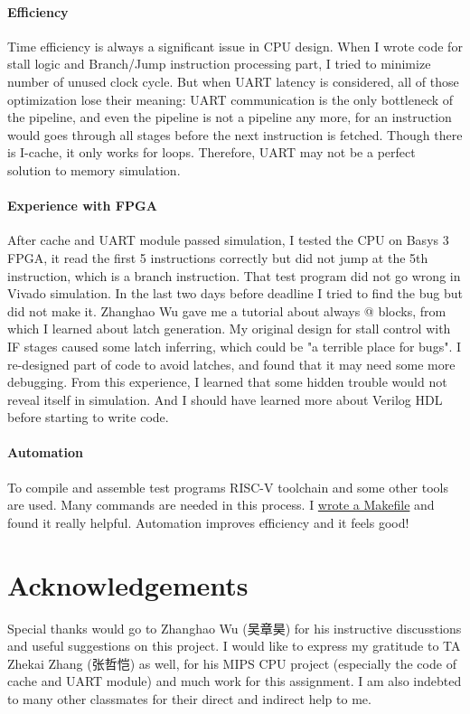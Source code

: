 \documentclass[12pt, a4paper]{article}
\theoremstyle{margin}
\begin{document}
\paragraph{Efficiency} Time efficiency is always a significant issue in CPU design. When I wrote code for stall logic and Branch/Jump instruction processing part, I tried to minimize number of unused clock cycle. But when UART latency is considered, all of those optimization lose their meaning: UART communication is the only bottleneck of the pipeline, and even the pipeline is not a pipeline any more, for an instruction would goes through all stages before the next instruction is fetched. Though there is I-cache, it only works for loops. Therefore, UART may not be a perfect solution to memory simulation.

\paragraph{Experience with FPGA} After cache and UART module passed simulation, I tested the CPU on Basys 3 FPGA, it read the first 5 instructions correctly but did not jump at the 5th instruction, which is a branch instruction. That test program did not go wrong in Vivado simulation. In the last two days before deadline I tried to find the bug but did not make it. Zhanghao Wu gave me a tutorial about always @ blocks\cite{always}, from which I learned about latch generation. My original design for stall control with IF stages caused some latch inferring, which could be "a
terrible place for bugs"\cite{always}. I re-designed part of code to avoid latches, and found that it may need some more debugging. From this experience, I learned that some hidden trouble would not reveal itself in simulation. And I should have learned more about Verilog HDL before starting to write code.

\paragraph{Automation} To compile and assemble test programs RISC-V toolchain and some other tools are used. Many commands are needed in this process. I \href{http://blog.evensgn.com/riscv-gnu-toolchain/}{wrote a Makefile} and found it really helpful. Automation improves efficiency and it feels good!

\section{Acknowledgements}
Special thanks would go to Zhanghao Wu (吴章昊) for his instructive discusstions and useful suggestions on this project. I would like to express my gratitude to TA Zhekai Zhang (张哲恺) as well, for his MIPS CPU project (especially the code of cache and UART module) and much work for this assignment. I am also indebted to many other classmates for their direct and indirect help to me.
\end{document}
